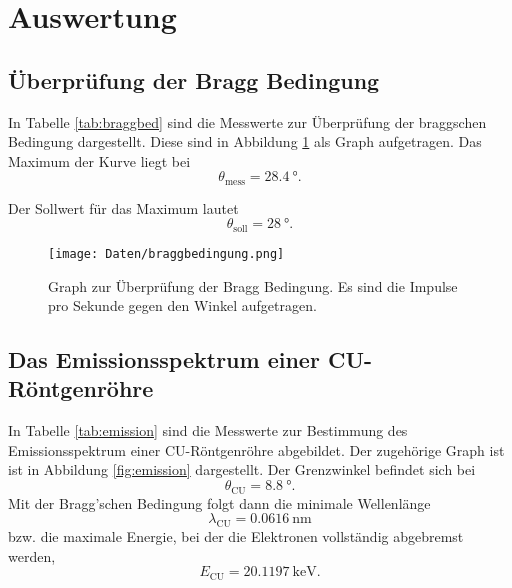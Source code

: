\section{Auswertung}
\label{sec:Auswertung}

\subsection{Überprüfung der Bragg Bedingung}

In Tabelle \ref{tab:braggbed} sind die Messwerte zur Überprüfung der braggschen
Bedingung dargestellt. Diese sind in Abbildung \ref{fig:braggbed} als Graph
aufgetragen.
Das Maximum der Kurve liegt bei
\begin{equation}
  \theta_\text{mess} = \SI{28.4}{\degree}.
\end{equation}

Der Sollwert für das Maximum lautet
\begin{equation}
  \theta_\text{soll} = \SI{28}{\degree}.
\end{equation}

\begin{figure}
  \centering
  \texttt{[image: Daten/braggbedingung.png]}
  \caption{Graph zur Überprüfung der Bragg Bedingung. Es sind die Impulse pro
  Sekunde gegen den Winkel aufgetragen.}
  \label{fig:braggbed}
\end{figure}

\subsection{Das Emissionsspektrum einer CU-Röntgenröhre}

In Tabelle \ref{tab:emission} sind die Messwerte zur Bestimmung des
Emissionsspektrum einer CU-Röntgenröhre abgebildet. Der zugehörige Graph ist
ist in Abbildung \ref{fig:emission} dargestellt.
Der Grenzwinkel befindet sich bei
\begin{equation}
  \theta_\text{CU} = \SI{8.8}{\degree}.
\end{equation}
Mit der Bragg'schen Bedingung folgt dann die minimale Wellenlänge
\begin{equation}
  \lambda_\text{CU} = \SI{0.0616}{\nano\meter}
\end{equation}
bzw. die maximale Energie, bei der die Elektronen vollständig abgebremst werden,
\begin{equation}
  E_\text{CU} = \SI{20.1197}{\kilo\electronvolt}.
\end{equation}


